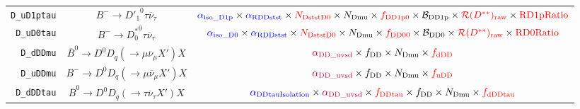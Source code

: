 \begin{landscape}
\begin{table}
\begin{tabular}{r|c|c}
      \texttt{D\_uD1ptau} &                 $B^- \rightarrow {D'_1}^0 \tau \overline{\nu}_\tau$                  &                          $\textcolor{blue}{\alpha_\text{iso\_D1p}} \times \textcolor{blue}{\alpha_\text{RDDstst}} \times \textcolor{red}{N_\text{DststD0}} \times N_\text{Dmu} \times \textcolor{red}{f_\text{DD1p0}} \times \mathcal{B}_\text{DD1p} \times \textcolor{red}{\mathcal{R}(D^{**})_\text{raw}} \times \textcolor{red}{\text{RD1pRatio}}$                          \\
       \texttt{D\_uD0tau} &                 $B^- \rightarrow {D^*_0}^0 \tau \overline{\nu}_\tau$                 &                            $\textcolor{blue}{\alpha_\text{iso\_D0}} \times \textcolor{blue}{\alpha_\text{RDDstst}} \times \textcolor{red}{N_\text{DststD0}} \times N_\text{Dmu} \times \textcolor{red}{f_\text{DD00}} \times \mathcal{B}_\text{DD0} \times \textcolor{red}{\mathcal{R}(D^{**})_\text{raw}} \times \textcolor{red}{\text{RD0Ratio}}$                            \\
        \texttt{D\_dDDmu} &    $\overline{B}^0 \rightarrow D^0 D_q (\rightarrow \mu \overline{\nu}_\mu X') X$    &                                                                                                                            $\textcolor{purple}{\alpha_\text{DD\_uvsd}} \times f_\text{DD} \times N_\text{Dmu} \times \textcolor{red}{f_\text{dDD}}$                                                                                                                            \\
        \texttt{D\_uDDmu} &         $B^- \rightarrow D^0 D_q (\rightarrow \mu \overline{\nu}_\mu X') X$          &                                                                                                                            $\textcolor{purple}{\alpha_\text{DD\_uvsd}} \times f_\text{DD} \times N_\text{Dmu} \times \textcolor{red}{f_\text{uDD}}$                                                                                                                            \\
       \texttt{D\_dDDtau} &   $\overline{B}^0 \rightarrow D^0 D_q (\rightarrow \tau \overline{\nu}_\tau X') X$   &                                                                            $\textcolor{blue}{\alpha_\text{DDtauIsolation}} \times \textcolor{purple}{\alpha_\text{DD\_uvsd}} \times \textcolor{red}{f_\text{DDtau}} \times f_\text{DD} \times N_\text{Dmu} \times \textcolor{red}{f_\text{dDDtau}}$                                                                            \\

\end{tabular}
\end{table}
\end{landscape}
